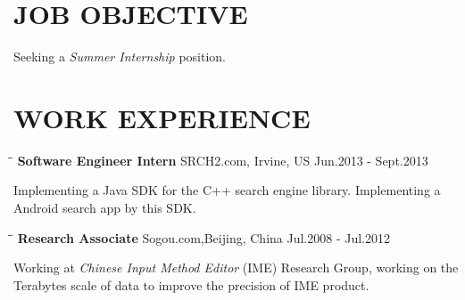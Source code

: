 \documentclass{res}
\begin{document}
 


\address{jianfeng.jia@gmail.com (949) 678-9893}
                                  
\begin{resume}

\section{JOB OBJECTIVE}          
    Seeking a \emph{Summer Internship} position.

\section{WORK EXPERIENCE}
   \vspace{-0.1in}	
   \begin{tabbing}
   \hspace{2.5in}\= \hspace{3in}\= \kill %
    {\bf Software Engineer Intern} \>SRCH2.com, Irvine, US     \>Jun.2013 - Sept.2013\\
   \end{tabbing}\vspace{-30pt}      %
   Implementing a Java SDK for the C++ search engine library. Implementing a Android search app by this SDK.
   \vspace{-0.1in}	
   \begin{tabbing}
   \hspace{2.5in}\= \hspace{3in}\= \kill %
    {\bf Research Associate} \>Sogou.com,Beijing, China     \>Jul.2008 - Jul.2012\\
   \end{tabbing}\vspace{-30pt}      %
   Working at \emph{Chinese Input Method Editor} (IME) Research Group, 
   working on the Terabytes scale of data to improve the precision of IME product.

\end{resume}
\end{document}
